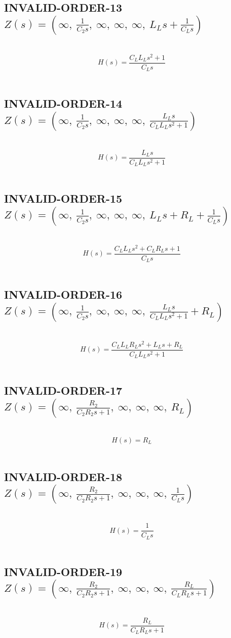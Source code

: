 \documentclass{article}
\begin{document}
\subsection{INVALID-ORDER-13 $Z(s) = \left( \infty, \  \frac{1}{C_{2} s}, \  \infty, \  \infty, \  \infty, \  L_{L} s + \frac{1}{C_{L} s}\right)$ } \ 
\textbf{\[H(s) = \frac{C_{L} L_{L} s^{2} + 1}{C_{L} s}\] } \ 
\subsection{INVALID-ORDER-14 $Z(s) = \left( \infty, \  \frac{1}{C_{2} s}, \  \infty, \  \infty, \  \infty, \  \frac{L_{L} s}{C_{L} L_{L} s^{2} + 1}\right)$ } \ 
\textbf{\[H(s) = \frac{L_{L} s}{C_{L} L_{L} s^{2} + 1}\] } \ 
\subsection{INVALID-ORDER-15 $Z(s) = \left( \infty, \  \frac{1}{C_{2} s}, \  \infty, \  \infty, \  \infty, \  L_{L} s + R_{L} + \frac{1}{C_{L} s}\right)$ } \ 
\textbf{\[H(s) = \frac{C_{L} L_{L} s^{2} + C_{L} R_{L} s + 1}{C_{L} s}\] } \ 
\subsection{INVALID-ORDER-16 $Z(s) = \left( \infty, \  \frac{1}{C_{2} s}, \  \infty, \  \infty, \  \infty, \  \frac{L_{L} s}{C_{L} L_{L} s^{2} + 1} + R_{L}\right)$ } \ 
\textbf{\[H(s) = \frac{C_{L} L_{L} R_{L} s^{2} + L_{L} s + R_{L}}{C_{L} L_{L} s^{2} + 1}\] } \ 
\subsection{INVALID-ORDER-17 $Z(s) = \left( \infty, \  \frac{R_{2}}{C_{2} R_{2} s + 1}, \  \infty, \  \infty, \  \infty, \  R_{L}\right)$ } \ 
\textbf{\[H(s) = R_{L}\] } \ 
\subsection{INVALID-ORDER-18 $Z(s) = \left( \infty, \  \frac{R_{2}}{C_{2} R_{2} s + 1}, \  \infty, \  \infty, \  \infty, \  \frac{1}{C_{L} s}\right)$ } \ 
\textbf{\[H(s) = \frac{1}{C_{L} s}\] } \ 
\subsection{INVALID-ORDER-19 $Z(s) = \left( \infty, \  \frac{R_{2}}{C_{2} R_{2} s + 1}, \  \infty, \  \infty, \  \infty, \  \frac{R_{L}}{C_{L} R_{L} s + 1}\right)$ } \ 
\textbf{\[H(s) = \frac{R_{L}}{C_{L} R_{L} s + 1}\] } \ 
\end{document}
